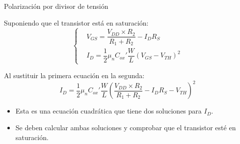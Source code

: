 \documentclass[t,aspectratio=169]{beamer}
\begin{document}
\begin{frame}{Polarización por divisor de tensión}

Suponiendo que el transistor está en saturación:
\[ \begin{cases}
    & V_{GS} = \dfrac{V_{DD} \times R_2}{R_1 + R_2} - I_D R_S \\
    & I_D = \dfrac{1}{2} \mu_n C_{ox}' \dfrac{W}{L} (V_{GS} - V_{TH})^2
\end{cases} \]

Al sustituir la primera ecuación en la segunda:
\[ I_D = \dfrac{1}{2} \mu_n C_{ox}' \dfrac{W}{L} \left(\dfrac{V_{DD} \times R_2}{R_1 + R_2} - I_D R_S - V_{TH} \right)^2 \]

\begin{itemize}
    \item Esta es una ecuación cuadrática que tiene dos soluciones para $I_D$.
    \item Se deben calcular ambas soluciones y comprobar que el transistor esté en saturación.
\end{itemize}

\end{frame}
\end{document}
